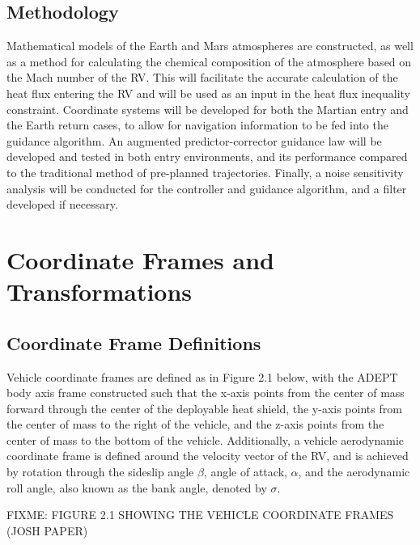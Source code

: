 \documentclass[12pt]{article}
\numberwithin{equation}{section}
\numberwithin{figure}{section}
\numberwithin{table}{section}
\begin{document}
\subsection{Methodology}
Mathematical models of the Earth and Mars atmospheres are constructed, as well as a method for calculating the chemical composition of the atmosphere based on the Mach number of the RV. This will facilitate the accurate calculation of the heat flux entering the RV and will be used as an input in the heat flux inequality constraint. Coordinate systems will be developed for both the Martian entry and the Earth return cases, to allow for navigation information to be fed into the guidance algorithm. An augmented predictor-corrector guidance law will be developed and tested in both entry environments, and its performance compared to the traditional method of pre-planned trajectories. Finally, a noise sensitivity analysis will be conducted for the controller and guidance algorithm, and a filter developed if necessary.

\section{Coordinate Frames and Transformations}
\subsection{Coordinate Frame Definitions}
Vehicle coordinate frames are defined as in Figure 2.1 below, with the ADEPT body axis frame constructed such that the x-axis points from the center of mass forward through the center of the deployable heat shield, the y-axis points from the center of mass to the right of the vehicle, and the z-axis points from the center of mass to the bottom of the vehicle. Additionally, a vehicle aerodynamic coordinate frame is defined around the velocity vector of the RV, and is achieved by rotation through the sideslip angle $\beta$, angle of attack, $\alpha$, and the aerodynamic roll angle, also known as the bank angle, denoted by $\sigma$.

FIXME: FIGURE 2.1 SHOWING THE VEHICLE COORDINATE FRAMES (JOSH PAPER)
\end{document}
